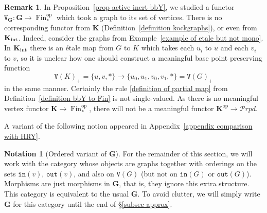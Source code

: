 \documentclass{amsart}
\numberwithin{theorem}{subsection}
\theoremstyle{definition}
\newtheorem{notation}[theorem]{Notation}
\newtheorem{remark}[theorem]{Remark}
\providecommand{\op}{\mathrm{op}}
\newcommand{\finset}{\operatorname{Fin}}
\newcommand{\pfinset}{\finset_*}
\newcommand{\name}[1]{\ensuremath{\text{\textup{#1}}}}
\newcommand{\bbY}{\mathbf{G}}
\newcommand{\kockgraphs}{\mathbf{K}}
\newcommand{\kockint}{\kockgraphs_{\name{int}}}
\newcommand{\out}{\mathtt{out}}
\newcommand{\inp}{\mathtt{in}}
\newcommand{\vertex}{\mathtt{V}}
\newcommand{\calproperad}{\mathcal{P}rpd}
\begin{document}
\begin{remark}\label{remark no vertex map Gr}
In Proposition~\ref{prop active inert bbY}, we studied a functor $\vertex_\bbY\colon \bbY\to \pfinset^\op$ which took a graph to its set of vertices.
There is no corresponding functor from $\kockgraphs$ (Definition~\ref{definition kockgraphs}), or even from $\kockint$.
Indeed, consider the graphs from Example~\ref{example of etale but not mono}. 
In $\kockint$ there is an \'etale map from $G$ to $K$ which takes each $u_i$ to $u$ and each $v_i$ to $v$, so it is unclear how one should construct a meaningful base point preserving function
\[
	\vertex(K)_+ = \{u,v, *\} \rightarrow \{u_0, u_1, v_0, v_1, *\} = \vertex(G)_+
\]
in the same manner.
Certainly the rule \eqref{definition of partial map} from Definition~\ref{definition bbY to Fin} is not single-valued.
As there is no meaningful vertex functor $\kockgraphs \to \pfinset^\op$, there will not be a meaningful functor $\kockgraphs^\op \to \calproperad$.
\end{remark}

A variant of the following notion appeared in Appendix~\ref{appendix comparison with HRY}.
\begin{notation}[Ordered variant of $\bbY$]
For the remainder of this section, we will work with the category whose objects are graphs together with orderings on the sets $\inp(v)$, $\out(v)$, and also on $\vertex(G)$ (but not on $\inp(G)$ or $\out(G)$).
Morphisms are just morphisms in $\bbY$, that is, they ignore this extra structure.
This category is equivalent to the usual $\bbY$. 
To avoid clutter, we will simply write $\bbY$ for this category until the end of \S\ref{subsec approx}.
\end{notation}
\end{document}
